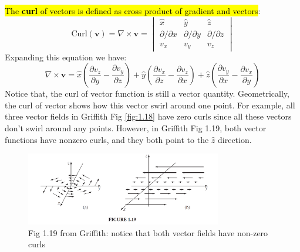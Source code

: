 \documentclass[12pt,a4paper,twoside]{article}
\numberwithin{equation}{section}
\begin{document}
	\noindent \hl{The \textbf{curl} of vectors is defined as cross product of gradient and vectors}:
	\begin{equation}
		\mathrm{Curl(\textbf{v})} = \nabla\times \textbf{v} = \begin{vmatrix} \hat{x}& \hat{y} &\hat{z} \\ \partial/\partial x & \partial/\partial y  &\partial/\partial z \\v_x  &v_y  &v_z \end{vmatrix}
	\end{equation}
	Expanding this equation we have:
	\[\nabla\times \textbf{v}=\hat{x}\left(\frac{\partial v_z}{\partial y}-\frac{\partial v_y}{\partial z}\right) +\hat{y}\left(\frac{\partial v_x}{\partial z}-\frac{\partial v_z}{\partial x}\right)+\hat{z}\left(\frac{\partial v_y}{\partial x}-\frac{\partial v_x}{\partial y}\right)\]
	Notice that, the curl of vector function is still a vector quantity. Geometrically, the curl of vector shows how this vector swirl around one point. For example, all three vector fields in Griffith Fig \ref{fig:1.18} have zero curls since all these vectors don't swirl around any points. However, in Griffith Fig 1.19, both vector functions have nonzero curls, and they both point to the \(\hat{z}\) direction.
	\begin{figure}[ht!]
		\centering
		\includegraphics[height=3.2cm]{curl.png}
		\caption{Fig 1.19 from Griffith: notice that both vector fields have non-zero curls }
		\label{fig:1.19}
	\end{figure}
\end{document}
